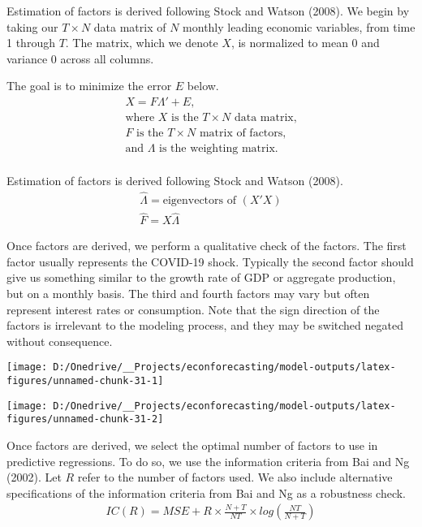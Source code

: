 \documentclass[11pt, letterpaper]{article}\usepackage[]{graphicx}\usepackage[]{color}
\begin{document}
Estimation of factors is derived following Stock and Watson (2008). We begin by taking our $T \times N$ data matrix of $N$ monthly leading economic variables, from time 1 through $T$. The matrix, which we denote $X$, is normalized to mean 0 and variance 0 across all columns.

The goal is to minimize the error $E$ below.
\begin{align*}
	X = F  \Lambda ' + E,\\
	\text{where $X$ is the $T \times N$ data matrix,}\\
	\text{$F$ is the $T \times N$ matrix of factors,}\\
	\text{and $\Lambda$ is the weighting matrix.}\\
\end{align*}

Estimation of factors is derived following Stock and Watson (2008).
\begin{align*}
	\widehat{\Lambda} = \text{eigenvectors of } (X'X)\\
	\widehat{F} = X \widehat{\Lambda}
\end{align*}

Once factors are derived, we perform a qualitative check of the factors. The first factor usually represents the COVID-19 shock. Typically the second factor should give us something similar to the growth rate of GDP or aggregate production, but on a monthly basis. The third and fourth factors may vary but often represent interest rates or consumption. Note that the sign direction of the factors is irrelevant to the modeling process, and they may be switched negated without consequence. 



{\centering \texttt{[image: D:/Onedrive/\_\_Projects/econforecasting/model-outputs/latex-figures/unnamed-chunk-31-1]} 

}




{\centering \texttt{[image: D:/Onedrive/\_\_Projects/econforecasting/model-outputs/latex-figures/unnamed-chunk-31-2]} 

}





Once factors are derived, we select the optimal number of factors to use in predictive regressions. To do so, we use the information criteria from Bai and Ng (2002). Let $R$ refer to the number of factors used. We also include alternative specifications of the information criteria from Bai and Ng as a robustness check.
\begin{align*}
	IC(R) = MSE + R \times \frac{N+T}{NT} \times log\left(\frac{NT}{N+T}\right)
\end{align*}
\end{document}
